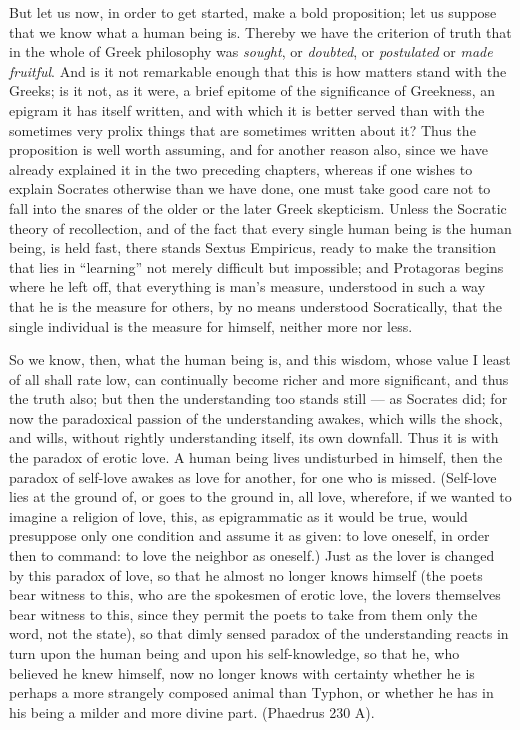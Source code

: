 \documentclass[12pt,a4paper,openany]{book}
\newcommand{\opage}[1]{\marginnote{\footnotesize\textit{[#1]}}}
\begin{document}
But let us now, in order to get started, make a bold proposition; let us suppose that
we know what a human being is. Thereby we have the criterion of truth that in the
whole of Greek philosophy was \emph{sought}, or \emph{doubted}, or \emph{postulated}
or \emph{made fruitful}. And is it not remarkable enough that this is how matters
stand with the Greeks; is it not, as it were, a brief epitome of the significance of
Greekness, an epigram it has itself written, and with which it is better served than
with the sometimes very prolix things that are sometimes written about it? Thus the
proposition is well worth assuming, and for another reason also, since we have
already explained it in the two preceding chapters, whereas if one wishes to explain
Socrates otherwise than we have done, one must take good care not to fall into the
snares of the older or the later Greek skepticism. Unless the Socratic theory of
recollection, and of the fact that every single human being is the human being, is
held fast, there stands Sextus Empiricus, ready to make the transition that lies in
``learning'' not merely difficult but impossible; and Protagoras begins where he
left off, that everything is man's measure, understood in such a way that he is the
measure for others, by no means understood Socratically, that the single individual
is the measure for himself, neither more nor less.

So we know, then, what the human being is, and this wisdom, whose value I least of
all shall rate low, can continually become richer and more significant, and thus
the truth also; but then the understanding too stands still --- as Socrates did; for
now the paradoxical passion of the understanding awakes, which wills the shock,
and wills, without rightly understanding itself, its own downfall. Thus it is with
the paradox of erotic love. A human being lives undisturbed in himself, then the
paradox of self-love awakes as love for another, for one who is missed.
\setcounter{footnote}{0}%
\opage{165}(Self-love lies at the ground of, or goes to the ground in, all love, wherefore, if
we wanted to imagine a religion of love, this, as epigrammatic as it would be true,
would presuppose only one condition and assume it as given: to love oneself, in
order then to command: to love the neighbor as oneself.) Just as the lover is changed
by this paradox of love, so that he almost no longer knows himself (the poets bear
witness to this, who are the spokesmen of erotic love, the lovers themselves bear
witness to this, since they permit the poets to take from them only the word, not the
state), so that dimly sensed paradox of the understanding reacts in turn upon the
human being and upon his self-knowledge, so that he, who believed he knew himself,
now no longer knows with certainty whether he is perhaps a more strangely composed
animal than Typhon, or whether he has in his being a milder and more divine part.
(Phaedrus 230 A).
\end{document}
